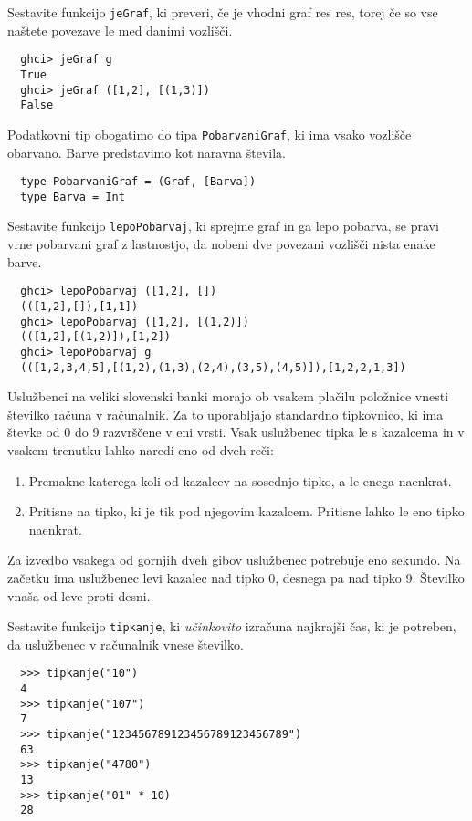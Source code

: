 \documentclass[arhiv]{../izpit}
\begin{document}
\podnaloga
  Sestavite funkcijo \texttt{jeGraf}, ki preveri, če je vhodni
  graf res res, torej če so vse naštete povezave le med danimi vozlišči.
  \begin{verbatim}
  ghci> jeGraf g
  True
  ghci> jeGraf ([1,2], [(1,3)])
  False
  \end{verbatim}

\podnaloga
  Podatkovni tip obogatimo do tipa \texttt{PobarvaniGraf}, ki ima
  vsako vozlišče obarvano. Barve predstavimo kot naravna števila.

  \begin{verbatim}
  type PobarvaniGraf = (Graf, [Barva])
  type Barva = Int
  \end{verbatim}

  Sestavite funkcijo \texttt{lepoPobarvaj}, ki sprejme graf in 
  ga lepo pobarva, se pravi vrne pobarvani graf z lastnostjo, 
  da nobeni dve povezani vozlišči nista enake barve.
  \begin{verbatim}
  ghci> lepoPobarvaj ([1,2], [])
  (([1,2],[]),[1,1])
  ghci> lepoPobarvaj ([1,2], [(1,2)])
  (([1,2],[(1,2)]),[1,2])
  ghci> lepoPobarvaj g
  (([1,2,3,4,5],[(1,2),(1,3),(2,4),(3,5),(4,5)]),[1,2,2,1,3])
  \end{verbatim}


  Uslužbenci na veliki slovenski banki morajo ob vsakem plačilu položnice vnesti številko računa v računalnik.
  Za to uporabljajo standardno tipkovnico, ki ima števke od
  0 do 9 razvrščene v eni vrsti. Vsak uslužbenec tipka le s
  kazalcema in v vsakem trenutku lahko naredi eno od dveh reči:

  \begin{enumerate}
    \item Premakne katerega koli od kazalcev na sosednjo tipko, a
    le enega naenkrat.
    \item Pritisne na tipko, ki je tik pod njegovim kazalcem. Pritisne
    lahko le eno tipko naenkrat.
  \end{enumerate}

 Za izvedbo vsakega od gornjih dveh gibov uslužbenec potrebuje eno sekundo. Na začetku ima uslužbenec levi kazalec nad tipko 0, desnega
 pa nad tipko 9. Številko vnaša od leve proti desni.

 Sestavite funkcijo \texttt{tipkanje}, ki {\em učinkovito}
 izračuna najkrajši čas, ki je potreben, da uslužbenec v
 računalnik vnese številko.

  \begin{verbatim}
  >>> tipkanje("10")
  4
  >>> tipkanje("107")
  7
  >>> tipkanje("123456789123456789123456789")
  63
  >>> tipkanje("4780")
  13
  >>> tipkanje("01" * 10)
  28
  \end{verbatim}
\end{document}
